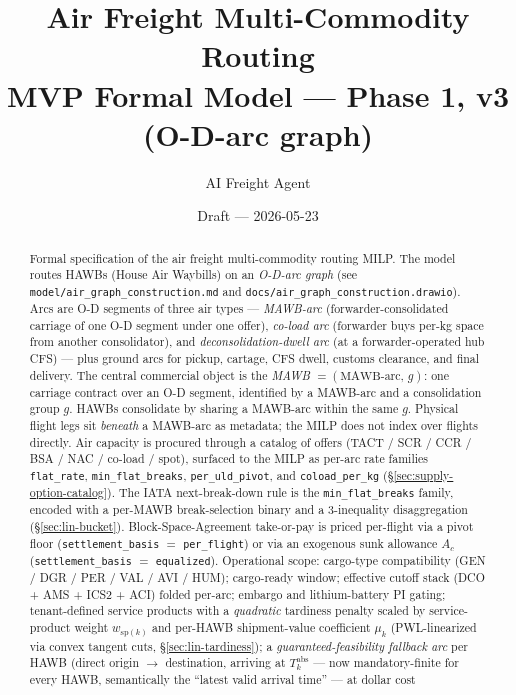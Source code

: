\documentclass[11pt,a4paper]{article}
\title{\textbf{Air Freight Multi-Commodity Routing}\\[0.4em]
\large MVP Formal Model --- Phase 1, v3 (O-D-arc graph)}
\author{AI Freight Agent}
\date{Draft --- 2026-05-23}
\theoremstyle{definition}
\begin{document}
\maketitle

\begin{abstract}
Formal specification of the air freight multi-commodity routing MILP. The model
routes HAWBs (House Air Waybills) on an \emph{O-D-arc graph} (see
\texttt{model/air\_graph\_construction.md} and
\texttt{docs/air\_graph\_construction.drawio}). Arcs are O-D segments of three
air types --- \emph{MAWB-arc} (forwarder-consolidated carriage of one O-D
segment under one offer), \emph{co-load arc} (forwarder buys per-kg space from
another consolidator), and \emph{deconsolidation-dwell arc} (at a
forwarder-operated hub CFS) --- plus ground arcs for pickup, cartage, CFS
dwell, customs clearance, and final delivery. The central commercial object is
the \emph{MAWB} $= (\text{MAWB-arc},\, g)$: one carriage contract over an O-D
segment, identified by a MAWB-arc and a consolidation group \(g\). HAWBs
consolidate by sharing a MAWB-arc within the same \(g\). Physical flight legs
sit \emph{beneath} a MAWB-arc as metadata; the MILP does not index over flights
directly. Air capacity is procured through a catalog of offers (TACT / SCR /
CCR / BSA / NAC / co-load / spot), surfaced to the MILP as per-arc rate
families \texttt{flat\_rate}, \texttt{min\_flat\_breaks}, \texttt{per\_uld\_pivot},
and \texttt{coload\_per\_kg} (\S\ref{sec:supply-option-catalog}). The IATA
next-break-down rule is the \texttt{min\_flat\_breaks} family, encoded with a
per-MAWB break-selection binary and a 3-inequality disaggregation
(\S\ref{sec:lin-bucket}). Block-Space-Agreement take-or-pay is priced
per-flight via a pivot floor (\texttt{settlement\_basis} \(=\)
\texttt{per\_flight}) or via an exogenous sunk allowance \(A_c\)
(\texttt{settlement\_basis} \(=\) \texttt{equalized}). Operational scope:
cargo-type compatibility (GEN / DGR / PER / VAL / AVI / HUM); cargo-ready
window; effective cutoff stack (DCO + AMS + ICS2 + ACI) folded per-arc;
embargo and lithium-battery PI gating; tenant-defined service products with a
\emph{quadratic} tardiness penalty scaled by service-product weight
\(w_{\text{sp}(k)}\) and per-HAWB shipment-value coefficient \(\mu_k\)
(PWL-linearized via convex tangent cuts, \S\ref{sec:lin-tardiness}); a
\emph{guaranteed-feasibility fallback arc} per HAWB (direct origin \(\to\)
destination, arriving at \(T_k^{\text{abs}}\) --- now mandatory-finite for every
HAWB, semantically the ``latest valid arrival time'' --- at dollar cost

\end{abstract}
\end{document}
